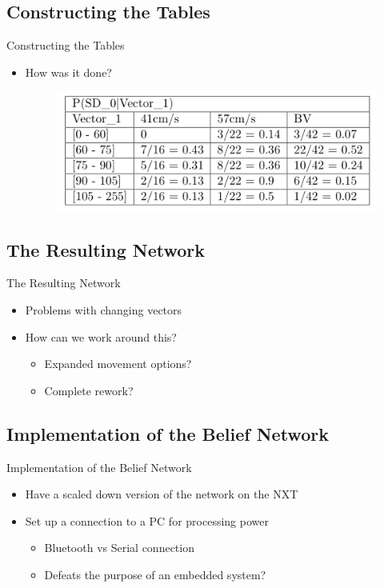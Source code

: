 \subsection{Constructing the Tables}
\begin{frame}{Constructing the Tables}
\begin{itemize}
\item How was it done? 
\begin{figure}
  \includegraphics[scale=0.6]{figures/SD0GivenV1.PNG}
\end{figure}

\end{itemize}
\end{frame}


\subsection{The Resulting Network}
\begin{frame}{The Resulting Network}
\begin{itemize}
\item Problems with changing vectors
\item How can we work around this?
\begin{itemize}
  \item Expanded movement options?
  \item Complete rework?
  \end{itemize}
\end{itemize}
\end{frame}


\subsection{Implementation of the Belief Network}
\begin{frame}{Implementation of the Belief Network}
\begin{itemize}
\item Have a scaled down version of the network on the NXT
\item Set up a connection to a PC for processing power
\begin{itemize}
   \item Bluetooth vs Serial connection
   \item Defeats the purpose of an embedded system?
   \end{itemize}
\end{itemize}
\end{frame}
